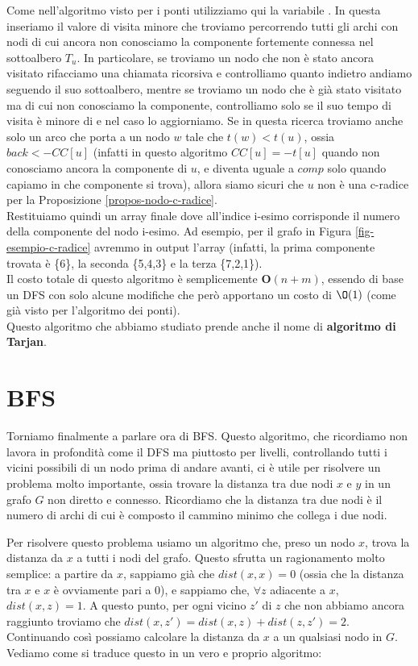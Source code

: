 \documentclass[11pt, a4paper, titlepage, oneside]{scrbook}
\begin{document}
Come nell'algoritmo visto per i ponti utilizziamo qui la variabile . In questa inseriamo il valore di visita minore che troviamo percorrendo tutti gli archi con nodi di cui ancora non conosciamo la componente fortemente connessa nel sottoalbero $T_u$. In particolare, se troviamo un nodo che non è stato ancora visitato rifacciamo una chiamata ricorsiva e controlliamo quanto indietro andiamo seguendo il suo sottoalbero, mentre se troviamo un nodo che è già stato visitato ma di cui non conosciamo la componente, controlliamo solo se il suo tempo di visita è minore di  e nel caso lo aggiorniamo. Se in questa ricerca troviamo anche solo un arco che porta a un nodo $w$ tale che $t(w) < t(u)$, ossia $back < -CC[u]$ (infatti in questo algoritmo $CC[u] = -t[u]$ quando non conosciamo ancora la componente di $u$, e diventa uguale a $comp$ solo quando capiamo in che componente si trova), allora siamo sicuri che $u$ non è una c-radice per la Proposizione \ref{propos-nodo-c-radice}.  \\
Restituiamo quindi un array finale  dove all'indice i-esimo corrisponde il numero della componente del nodo i-esimo. Ad esempio, per il grafo in Figura \ref{fig-esempio-c-radice} avremmo in output l'array \code{[3,3,2,2,2,1,3]} (infatti, la prima componente trovata è \{6\}, la seconda \{5,4,3\} e la terza \{7,2,1\}). \\
Il costo totale di questo algoritmo è semplicemente $\textbf{O}(n+m)$, essendo di base un DFS con solo alcune modifiche che però apportano un costo di $\O(1)$ (come già visto per l'algoritmo dei ponti). \\
Questo algoritmo che abbiamo studiato prende anche il nome di \textbf{algoritmo di Tarjan}.

\section{BFS}

Torniamo finalmente a parlare ora di BFS. Questo algoritmo, che ricordiamo non lavora in profondità come il DFS ma piuttosto per livelli, controllando tutti i vicini possibili di un nodo prima di andare avanti, ci è utile per risolvere un problema molto importante, ossia trovare la distanza tra due nodi $x$ e $y$ in un grafo $G$ non diretto e connesso. Ricordiamo che la distanza tra due nodi è il numero di archi di cui è composto il cammino minimo che collega i due nodi. 

Per risolvere questo problema usiamo un algoritmo che, preso un nodo $x$, trova la distanza da $x$ a tutti i nodi del grafo. Questo sfrutta un ragionamento molto semplice: a partire da $x$, sappiamo già che $dist(x,x) = 0$ (ossia che la distanza tra $x$ e $x$ è ovviamente pari a $0$), e sappiamo che, $\forall z$ adiacente a $x$, $dist(x,z) = 1$. A questo punto, per ogni vicino $z'$ di $z$ che non abbiamo ancora raggiunto troviamo che $dist(x,z') = dist(x,z) + dist(z,z') = 2$. Continuando così possiamo calcolare la distanza da $x$ a un qualsiasi nodo in $G$. Vediamo come si traduce questo in un vero e proprio algoritmo:
\end{document}
